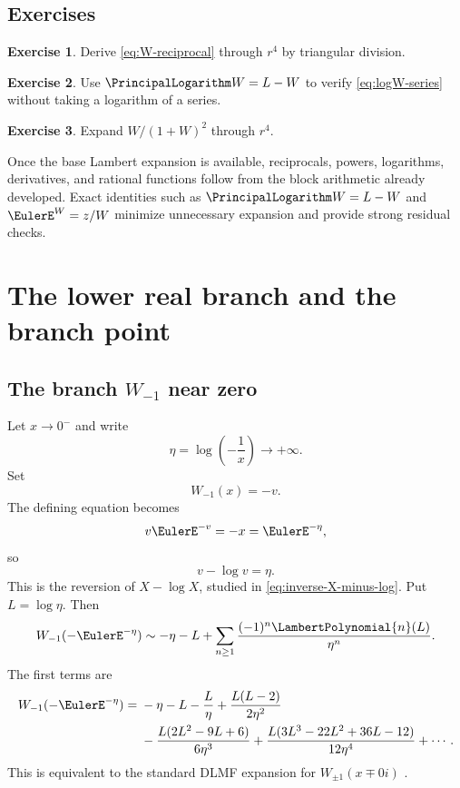 \documentclass[11pt,openany]{book}
\theoremstyle{definition}
\newtheorem{exercise}{Exercise}[chapter]
\theoremstyle{plain}
\theoremstyle{remark}
\begin{document}
\section{Exercises}
\begin{exercise}
Derive \cref{eq:W-reciprocal} through \(r^4\) by triangular division.
\end{exercise}
\begin{exercise}
Use \(\PrincipalLogarithm W=L-W\) to verify \cref{eq:logW-series} without taking a logarithm of a series.
\end{exercise}
\begin{exercise}
Expand \(W/(1+W)^2\) through \(r^4\).
\end{exercise}

\begin{summarybox}
Once the base Lambert expansion is available, reciprocals, powers, logarithms, derivatives, and rational functions follow from the block arithmetic already developed. Exact identities such as \(\PrincipalLogarithm W=L-W\) and \(\EulerE^W=z/W\) minimize unnecessary expansion and provide strong residual checks.
\end{summarybox}

\chapter{The lower real branch and the branch point}\label{ch:W-other-regimes}

\section{The branch \texorpdfstring{\(W_{-1}\)}{W-1} near zero}
Let \(x\to0^-\) and write
\begin{equation}\label{eq:eta-def}
 \eta=\log\left(-\frac1x\right)\to+\infty.
\end{equation}
Set
\[
 W_{-1}(x)=-v.
\]
The defining equation becomes
\[
 v\EulerE^{-v}=-x=\EulerE^{-\eta},
\]
so
\begin{equation}\label{eq:v-minus-logv}
 v-\log v=\eta.
\end{equation}
This is the reversion of \(X-\log X\), studied in \cref{eq:inverse-X-minus-log}. Put \(L=\log\eta\). Then
\begin{equation}\label{eq:Wminus1-Pn}
 W_{-1}(-\EulerE^{-\eta})
 \sim-\eta-L+
 \sum_{n\ge1}\frac{(-1)^n\LambertPolynomial{n}(L)}{\eta^n}.
\end{equation}
The first terms are
\begin{align}
 W_{-1}(-\EulerE^{-\eta})={}&-\eta-L-\frac{L}{\eta}
 +\frac{L(L-2)}{2\eta^2}\notag\\
 &-\frac{L(2L^2-9L+6)}{6\eta^3}
 +\frac{L(3L^3-22L^2+36L-12)}{12\eta^4}
 +\cdots.
\label{eq:Wminus1-expanded}
\end{align}
This is equivalent to the standard DLMF expansion for \(W_{\pm1}(x\mp0i)\) \cite{dlmf-W}.
\end{document}
